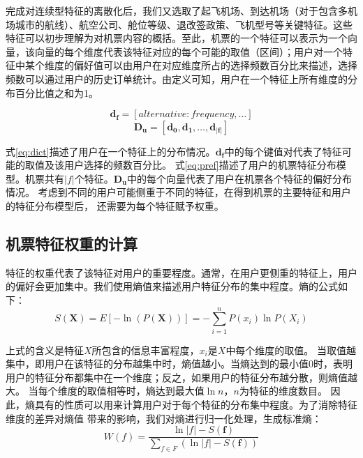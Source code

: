 完成对连续型特征的离散化后，我们又选取了起飞机场、到达机场（对于包含多机场城市的航线）、航空公司、舱位等级、退改签政策、飞机型号等关键特征。这些特征可以初步理解为对机票内容的概括。至此，机票的一个特征可以表示为一个向量，该向量的每个维度代表该特征对应的每个可能的取值（区间）；用户对一个特征中某个维度的偏好值可以由用户在对应维度所占的选择频数百分比来描述，选择频数可以通过用户的历史订单统计。由定义可知，用户在一个特征上所有维度的分布百分比值之和为1。

\begin{equation}
\label{eq:dict}
	\mathbf{d_f} = [alternative:frequency,\dots]
\end{equation}
\begin{equation}
\label{eq:pref}
	\mathbf{D_u} = [\mathbf{d_0},\mathbf{d_1},\dots,\mathbf{d_{|f|}}]
\end{equation}

式\ref{eq:dict}描述了用户在一个特征上的分布情况。$\mathbf{d_f}$中的每个键值对代表了特征可能的取值及该用户选择的频数百分比。
式\ref{eq:pref}描述了用户的机票特征分布模型。机票共有$|f|$个特征。$\mathbf{D_u}$中的每个向量代表了用户在机票各个特征的偏好分布情况。
考虑到不同的用户可能侧重于不同的特征，在得到机票的主要特征和用户的特征分布模型后，
还需要为每个特征赋予权重。

\subsection{机票特征权重的计算}

特征的权重代表了该特征对用户的重要程度。通常，在用户更侧重的特征上，用户的偏好会更加集中。我们使用熵值来描述用户特征分布的集中程度。熵的公式如下：
\begin{equation}
\label{eq:entropy}
	S(\mathbf{X}) = E[-\ln (P(\mathbf{X}))] = - \sum_{i=1}^n P(x_i)\ln P(X_i)
\end{equation}

上式的含义是特征$X$所包含的信息丰富程度，$x_i$是$X$中每个维度的取值。
当取值越集中，即用户在该特征的分布越集中时，熵值越小。当熵达到的最小值$0$时，表明用户的特征分布都集中在一个维度；反之，如果用户的特征分布越分散，则熵值越大。
当每个维度的取值相等时，熵达到最大值$\ln n$，$n$为特征的维度数目。
因此，熵具有的性质可以用来计算用户对于每个特征的分布集中程度。为了消除特征维度的差异对熵值
带来的影响，我们对熵进行归一化处理，生成标准熵：
\begin{equation}
  W(f) = \frac{\ln |f| - S(\mathbf{f})}{\sum_{f \in F}(\ln |f| - S(\mathbf{f}))}
\end{equation}

